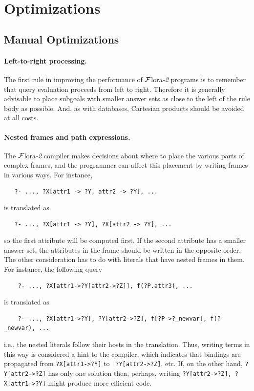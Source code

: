 \documentclass[11pt]{article}
\newcommand{\FLSYSTEM}{{\mbox{\sc ${\cal F}${lora}\rm\emph{-2}}}\xspace}
\begin{document}
\section{Optimizations}

\subsection{Manual Optimizations}

\paragraph{Left-to-right processing.}
The first rule in improving the performance of \FLSYSTEM programs is to
remember that query evaluation proceeds from left to right. Therefore it is
generally advisable to place subgoals with smaller answer sets as close to
the left of the rule body as possible. And, as with databases, Cartesian
products should be avoided at all costs.

\paragraph{Nested frames and path expressions.}
The \FLSYSTEM compiler makes decisions about
where to place the various parts of complex frames, and the
programmer can affect this placement by writing frames in various ways.
For instance,
\begin{verbatim}
   ?- ..., ?X[attr1 -> ?Y, attr2 -> ?Y], ...
\end{verbatim}
is translated as
\begin{verbatim}
   ?- ..., ?X[attr1 -> ?Y], ?X[attr2 -> ?Y], ...  
\end{verbatim}
so the first attribute will be computed first. If the second attribute has
a smaller answer set, the attributes in the frame should be written in
the opposite order. The other consideration has to do with literals that
have nested frames in them. For instance, the following query
\begin{verbatim}
    ?- ..., ?X[attr1->?Y[attr2->?Z]], f(?P.attr3), ...
\end{verbatim}
is translated as
\begin{verbatim}
    ?- ..., ?X[attr1->?Y], ?Y[attr2->?Z], f[?P->?_newvar], f(?_newvar), ...
\end{verbatim}
i.e., the nested literals follow their hosts in the translation.
Thus, writing terms in this way is considered a hint to the compiler, which
indicates that bindings are propagated from {\tt ?X[attr1->?Y]} to {\tt
  ?Y[attr2->?Z]}, etc. If, on the other hand, {\tt ?Y[attr2->?Z]} has only one
solution then, perhaps, writing {\tt ?Y[attr2->?Z], ?X[attr1->?Y]} might
produce more efficient code.
\end{document}
